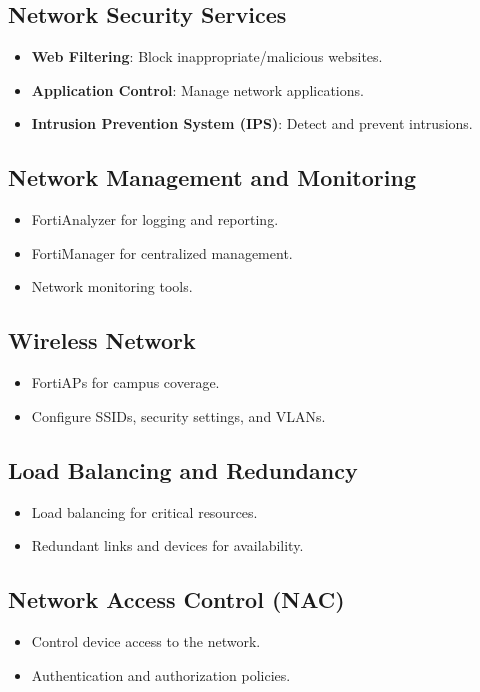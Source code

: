 \documentclass[12pt]{report}
\begin{document}
\subsection{Network Security Services}
\begin{itemize}
    \item \textbf{Web Filtering}: Block inappropriate/malicious websites.
    \item \textbf{Application Control}: Manage network applications.
    \item \textbf{Intrusion Prevention System (IPS)}: Detect and prevent intrusions.
\end{itemize}

\subsection{Network Management and Monitoring}
\begin{itemize}
    \item FortiAnalyzer for logging and reporting.
    \item FortiManager for centralized management.
    \item Network monitoring tools.
\end{itemize}

\subsection{Wireless Network}
\begin{itemize}
    \item FortiAPs for campus coverage.
    \item Configure SSIDs, security settings, and VLANs.
\end{itemize}

\subsection{Load Balancing and Redundancy}
\begin{itemize}
    \item Load balancing for critical resources.
    \item Redundant links and devices for availability.
\end{itemize}

\subsection{Network Access Control (NAC)}
\begin{itemize}
    \item Control device access to the network.
    \item Authentication and authorization policies.
\end{itemize}
\end{document}
